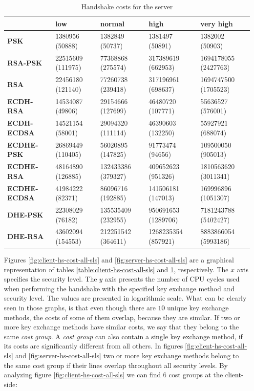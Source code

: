 \documentclass{llncs}
\begin{document}
  \begin{table}[]
\begin{tabular}{|l|l|l|l|l|}
\hline
                     & \textbf{low}      & \textbf{normal}    & \textbf{high}       & \textbf{very high}   \\ \hline
\textbf{PSK}         & 1380956 (50888)   & 1382849 (50737)    & 1381497 (50891)     & 1382002 (50903)      \\ \hline
\textbf{RSA-PSK}     & 22515609 (111975) & 77368868 (275574)  & 317389619 (662953)  & 1694178055 (2427763) \\ \hline
\textbf{RSA}         & 22456180 (121140) & 77260738 (239418)  & 317196961 (698637)  & 1694747500 (1705523) \\ \hline
\textbf{ECDH-RSA}    & 14534087 (49806)  & 29154666 (127699)  & 46480720 (107771)   & 55636527 (576001)    \\ \hline
\textbf{ECDH-ECDSA}  & 14521154 (58001)  & 29094320 (111114)  & 46390603 (132250)   & 55927921 (688074)    \\ \hline
\textbf{ECDHE-PSK}   & 26869449 (110405) & 56020895 (147825)  & 91773474 (94656)    & 109500050 (905013)   \\ \hline
\textbf{ECDHE-RSA}   & 48164890 (126885) & 132433386 (379327) & 409652623 (951326)  & 1810563620 (3011341) \\ \hline
\textbf{ECDHE-ECDSA} & 41984222 (82371)  & 86096716 (192885)  & 141506181 (147013)  & 169996896 (1051307)  \\ \hline
\textbf{DHE-PSK}     & 22308029 (76182)  & 135535409 (232955) & 950691653 (1289706) & 7181243788 (5402427) \\ \hline
\textbf{DHE-RSA}     & 43602094 (154553) & 212251542 (364611) & 1268235354 (857921) & 8883866054 (5993186) \\ \hline
\end{tabular}
  \centering \centering \caption{\label{table:server-hs-cost-all-sls} Handshake costs for the server}
\end{table}

Figures \ref{fig:client-hs-cost-all-sls} and \ref{fig:server-hs-cost-all-sls} are a graphical representation of tables \ref{table:client-hs-cost-all-sls}
and \ref{table:server-hs-cost-all-sls}, respectively. The $x$ axis specifies the security level. The $y$ axis presents the number
of CPU cycles used when performing the handshake with the specified key exchange method and security level.
The values are presented in logarithmic scale.  What can be clearly seen in those
graphs, is that even though there are $10$ unique key exchange methods, the costs of some of them overlap, because they are similar.
If two or more key exchange methods have similar costs, we say that they belong to the same \textit{cost group}. A \textit{cost group}
can also contain a single key exchange method, if its costs are significantly different from all others. In figures
\ref{fig:client-hs-cost-all-sls} and \ref{fig:server-hs-cost-all-sls} two or more key exchange methods belong to the same
cost group if their lines overlap throughout all security levels. By analyzing figure \ref{fig:client-hs-cost-all-sls} we can
find $6$ cost groups at the client-side:
\end{document}
